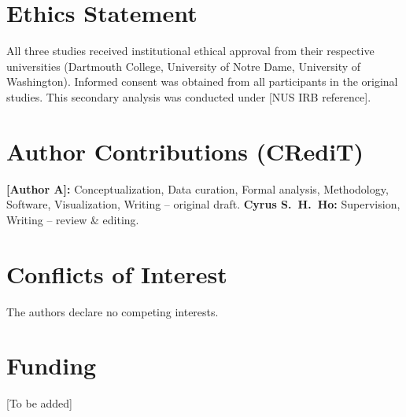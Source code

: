 \documentclass[12pt, a4paper]{article}
\begin{document}
\section*{Ethics Statement}

All three studies received institutional ethical approval from their respective universities (Dartmouth College, University of Notre Dame, University of Washington). Informed consent was obtained from all participants in the original studies. This secondary analysis was conducted under [NUS IRB reference].

\section*{Author Contributions (CRediT)}

\textbf{[Author A]:} Conceptualization, Data curation, Formal analysis, Methodology, Software, Visualization, Writing -- original draft. \textbf{Cyrus S.~H.~Ho:} Supervision, Writing -- review \& editing.

\section*{Conflicts of Interest}

The authors declare no competing interests.

\section*{Funding}

[To be added]






\end{document}
